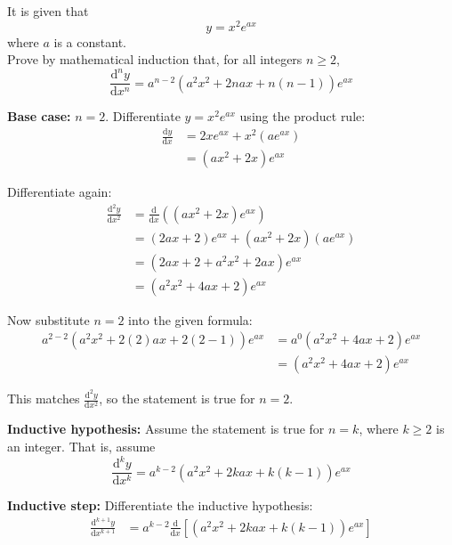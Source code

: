 \documentclass[leqno]{article}
\begin{document}
\djsFrontMatter
\begin{enumerate}[
  label=\textbf{\arabic*.},
  leftmargin=*,
  topsep=0pt,
  partopsep=0pt,
  parsep=0pt
]

\questionitem

It is given that \[y = x^2 e^{ax}\] where $a$ is a constant. \\

Prove by mathematical induction that, for all integers $n \ge 2$,
\[
\frac{\mathrm{d}^n y}{\mathrm{d}x^n} = a^{n-2}\left(a^2x^2 + 2nax + n(n-1)\right)e^{ax}
\] 

\vspace*{10pt}

\begin{djsSolution}
\textbf{Base case:} \(n=2\). Differentiate \(y=x^2e^{ax}\) using the product rule:
\begin{align*}
\frac{\mathrm{d}y}{\mathrm{d}x}
&=2xe^{ax}+x^2(ae^{ax}) \\
&=(ax^2+2x)e^{ax}
\end{align*}

Differentiate again:
\begin{align*}
\frac{\mathrm{d}^2y}{\mathrm{d}x^2}
&=\frac{\mathrm{d}}{\mathrm{d}x}\left((ax^2+2x)e^{ax}\right) \\
&=(2ax+2)e^{ax}+(ax^2+2x)(ae^{ax}) \\
&=(2ax+2+a^2x^2+2ax)e^{ax} \\
&=(a^2x^2+4ax+2)e^{ax}
\end{align*}

Now substitute \(n=2\) into the given formula:
\begin{align*}
a^{2-2}\left(a^2x^2+2(2)ax+2(2-1)\right)e^{ax}
&=a^0(a^2x^2+4ax+2)e^{ax} \\
&=(a^2x^2+4ax+2)e^{ax}
\end{align*}

This matches \(\frac{\mathrm{d}^2y}{\mathrm{d}x^2}\), so the statement is true for \(n=2\).

\textbf{Inductive hypothesis:} Assume the statement is true for \(n=k\), where \(k\ge 2\) is an integer. That is, assume
\[
\frac{\mathrm{d}^k y}{\mathrm{d}x^k}
=a^{k-2}\left(a^2x^2+2kax+k(k-1)\right)e^{ax}
\]

\textbf{Inductive step:} Differentiate the inductive hypothesis:
\begin{align*}
\frac{\mathrm{d}^{k+1}y}{\mathrm{d}x^{k+1}}
&=a^{k-2}\frac{\mathrm{d}}{\mathrm{d}x}\left[\left(a^2x^2+2kax+k(k-1)\right)e^{ax}\right]
\end{align*}


\end{djsSolution}
\end{enumerate}
\end{document}
